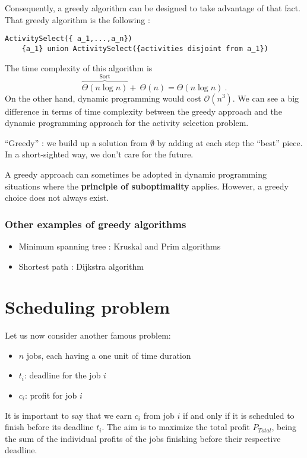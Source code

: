 Consequently, a greedy algorithm can be designed to take advantage of that fact. That greedy algorithm is the following :
\begin{lstlisting}[label={list:c6:activitySelectionGreedy},caption=Pseudo-code of the greedy algorithm for activity selection problem]
ActivitySelect({ a_1,...,a_n})
	{a_1} union ActivitySelect({activities disjoint from a_1})
\end{lstlisting}
The time complexity of this algorithm is 
\begin{equation*}
\overbrace{\Theta(n \log n)}^{\text{Sort}} + \: \Theta(n) = \Theta(n \log n) \: .
\end{equation*}
On the other hand, dynamic programming would cost $\mathcal{O}(n^3)$. We can see a big difference in terms of time complexity between the greedy approach and the dynamic programming approach for the activity selection problem.

“Greedy” : we build up a solution from $\emptyset$ by adding at each step the “best” piece. In a short-sighted way, we don’t care for the future.

A greedy approach can sometimes be adopted in dynamic programming situations where the \textbf{principle of suboptimality} applies. However, a greedy choice does not always exist. 

\subsubsection{Other examples of greedy algorithms}
\begin{itemize}
 \item Minimum spanning tree : Kruskal and Prim algorithms
 \item Shortest path : Dijkstra algorithm
\end{itemize}

\section{Scheduling problem}
Let us now consider another famous problem:
\begin{itemize}
 \item $n$ jobs, each having a one unit of time duration
 \item $t_i$: deadline for the job $i$
 \item $c_i$: profit for job $i$
\end{itemize}

It is important to say that we earn $c_i$ from job $i$ if and only if it is scheduled to finish before its deadline $t_i$. The aim is to maximize the total profit $P_{Total}$, being the sum of the individual profits of the jobs finishing before their respective deadline.

